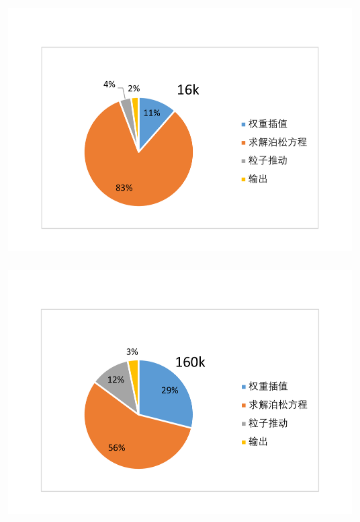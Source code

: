 \begin{figure}[!htb]
    \centering
    \begin{subfigure}[b]{0.75\textwidth}
        \includegraphics[width=\textwidth]{Img/PIC_speedup_1GPU_percentage1.pdf}
    \end{subfigure}
    \quad
    \begin{subfigure}[b]{0.75\textwidth}
        \includegraphics[width=\textwidth]{Img/PIC_speedup_1GPU_percentage2.pdf}
    \end{subfigure}
    \quad
    \begin{subfigure}[b]{0.75\textwidth}

\end{subfigure}
\end{figure}
